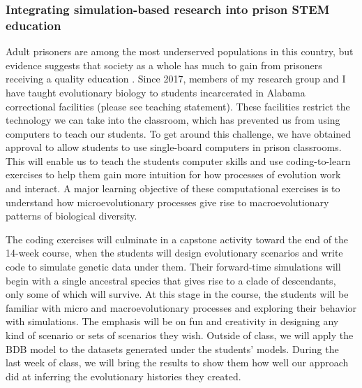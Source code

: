 \subsubsection*{Integrating simulation-based research into prison STEM education}

Adult prisoners are among the most underserved populations in this
country,
but evidence suggests that society as a whole has much to gain from prisoners
receiving a quality education \cite{Vacca2004}.
Since 2017, members of my research group and I have taught evolutionary biology
to students incarcerated in Alabama correctional facilities (please see
teaching statement).
These facilities restrict the technology we can take into the classroom, which
has prevented us from using computers to teach our students.
To get around this challenge, we have obtained approval to allow students to use
single-board computers in prison classrooms.
This will enable us to teach the students computer skills and use
coding-to-learn exercises to help them gain more intuition for how processes of
evolution work and interact.
A major learning objective of these computational exercises is to understand
how microevolutionary processes give rise to macroevolutionary patterns of
biological diversity.

The coding exercises will culminate in a capstone activity toward the end of
the 14-week course, when the students will design evolutionary scenarios and
write code to simulate genetic data under them.
Their forward-time simulations will begin with a single ancestral species
that gives rise to a clade of descendants, only some of which
will survive.
At this stage in the course, the students will be familiar with
micro and macroevolutionary processes and exploring their behavior
with simulations.
The emphasis will be on fun and creativity in designing any kind of scenario
or sets of scenarios they wish.
Outside of class, we will apply the BDB model
to the datasets generated under the students' models.
During the last week of class, we will bring the results to show them how well
our approach did at inferring the evolutionary histories they created.

